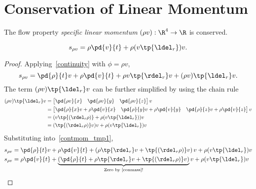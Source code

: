 \section{Conservation of Linear Momentum}
\begin{df}
    The flow property \emph{specific linear momentum} $(\rho v):\R^4\to \R$ is conserved.
\end{df}
\begin{thm}
    \begin{equation}
        \label{convlinmom}
        s_{\rho v} = \rho \pd{v}{t} + \rho (v\tp{\ldel_r}) v.
    \end{equation}
\end{thm}
\begin{proof}
    Applying~\autoref{continuity} with $\phi=\rho v$,
    \begin{equation}
        \label{contmom_tmp1}
        s_{\rho v} = \pd{\rho}{t}v + \rho \pd{v}{t}  + \rho v \tp{\rdel_r} v  + (\rho v) \tp{\ldel_r} v.
    \end{equation}
    The term $(\rho v) \tp{\ldel_r}v$ can be further simplified by using the chain rule
    \begin{align}
        (\rho v) \tp{\ldel_r} v &= \begin{bmatrix}
            \pd{\rho v}{x} & \pd{\rho v}{y} & \pd{\rho v}{z}
        \end{bmatrix} v \\
        &= \begin{bmatrix}
            \pd{\rho}{x} v + \rho \pd{v}{x} & \pd{\rho}{y} v + \rho \pd{v}{y} & \pd{\rho}{z} v + \rho \pd{v}{z}
        \end{bmatrix} v \\
        &= (v\tp{(\rdel_r\rho)} + \rho (v\tp{\ldel_r})) v \\
        &= (\tp{(\rdel_r\rho)}v)v + \rho (v\tp{\ldel_r}) v
    \end{align}
    Substituting into~\autoref{contmom_tmp1},
    \begin{align}
        s_{\rho v} &= \pd{\rho}{t}v + \rho \pd{v}{t}  + \left(\rho \tp{\rdel_r} v + \tp{(\rdel_r\rho)}v \right) v  + \rho (v\tp{\ldel_r}) v \\
        s_{\rho v} &= \rho \pd{v}{t}  + \underbrace{\left(\pd{\rho}{t} + \rho \tp{\rdel_r} v + \tp{(\rdel_r\rho)}v \right)}_{\text{Zero by~\autoref{conmass}!}} v  + \rho (v\tp{\ldel_r}) v
    \end{align}
\end{proof}

